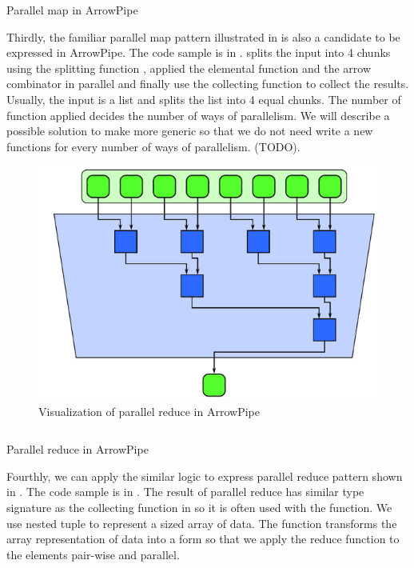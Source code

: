 \begin{listing}[ht]
    \inputminted{Haskell}{arrow/pmap.hs}
    \caption{Parallel map in ArrowPipe}
    \label{arrow:code:pmap}
\end{listing}
Thirdly, the familiar parallel map pattern illustrated in  is also a candidate to be expressed in ArrowPipe. The code sample is in .  splits the input  into 4 chunks using the splitting function , applied the elemental function  and the arrow combinator \hask{***} in parallel and finally use the collecting function  to collect the results. Usually, the input  is a list and  splits the list into 4 equal chunks. The number of function  applied decides the number of ways of parallelism. We will describe a possible solution to make  more generic so that we do not need write a new functions for every number of ways of parallelism. (TODO).

\begin{figure}[ht]
    \centering 
    \includegraphics{arrow/preduc.png}
    \caption{Visualization of parallel reduce in ArrowPipe \cite{mccoolStructuredParallelPrograming2012}}
    \label{arrow:fig:preduc}
\end{figure}
\begin{listing}[ht]
    \inputminted{Haskell}{arrow/preduc.hs} 
    \caption{Parallel reduce in ArrowPipe}
    \label{arrow:code:preduc}
\end{listing}
Fourthly, we can apply the similar logic to express parallel reduce pattern shown in . The code sample is in . The result of parallel reduce has similar type signature as the collecting function in  so it is often used with the  function. We use nested tuple  to represent a sized array of data. The  function transforms the array representation of data into a form so that we apply the reduce function  to the elements pair-wise and parallel.

